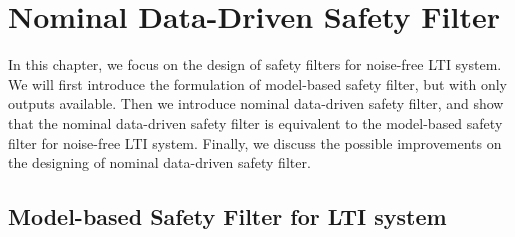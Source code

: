 \chapter{Nominal Data-Driven Safety Filter}\label{chap:nominal-ddsf}

In this chapter, we focus on the design of safety filters for noise-free LTI system.
We will first introduce the formulation of model-based safety filter, but with only outputs available.
Then we introduce nominal data-driven safety filter, and show that the nominal data-driven safety filter is equivalent to the model-based safety filter for noise-free LTI system.
Finally, we discuss the possible improvements on the designing of nominal data-driven safety filter.

\section{Model-based Safety Filter for LTI system}\label{sec:formulation-nominal}

